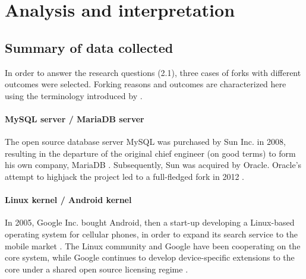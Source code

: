
\chapter{Analysis and interpretation} %

\label{Chapter4} %


\section{Summary of data collected}
In order to answer the research questions (2.1), three cases of forks with different outcomes were selected. Forking reasons and outcomes are characterized here using the terminology introduced by \citet{Robles2012a}.

\subsubsection{MySQL server / MariaDB server}
The open source database server MySQL was purchased by Sun Inc. in 2008, resulting in the departure of the original chief engineer (on good terms) to form his own company, MariaDB \citep{Widenius2009}. Subsequently, Sun was acquired by Oracle. Oracle’s attempt to highjack the project \citep{Nyman2013a} led to a full-fledged fork in 2012 \citep{Widenius2012}.

\begin{description}
  

\end{description}

\subsubsection{Linux kernel / Android kernel}
In 2005, Google Inc. bought Android, then a start-up developing a Linux-based operating system for cellular phones, in order to expand its search service to the mobile market \citep{Elgin2005}. The Linux community and Google have been cooperating on the core system, while Google continues to develop device-specific extensions to the core under a shared open source licensing regime \citep{Vaughan-Nichols2011}.

